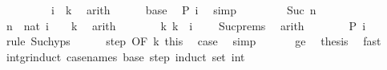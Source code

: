 \begin{isabellebody}
\ {}\isanewline
\ \ \ \ \isamarkupfalse%
\ \isamarkupfalse%
\ {\isachardoublequoteopen}i\ {\isacharequal}{\kern0pt}\ k{\isachardoublequoteclose}\ \isamarkupfalse%
\ arith\isanewline
\ \ \ \ \isamarkupfalse%
\ base\ \isamarkupfalse%
\ {\isachardoublequoteopen}P\ i{\isachardoublequoteclose}\ \isamarkupfalse%
\ simp\isanewline
\ \ \isamarkupfalse%
\isanewline
\ \ \ \ \isamarkupfalse%
\ {\isacharparenleft}{\kern0pt}Suc\ n{\isacharparenright}{\kern0pt}\isanewline
\ \ \ \ \isamarkupfalse%
\ \isamarkupfalse%
\ {\isachardoublequoteopen}n\ {\isacharequal}{\kern0pt}\ nat\ {\isacharparenleft}{\kern0pt}{\isacharparenleft}{\kern0pt}i\ {\isacharminus}{\kern0pt}\ {}{\isacharparenright}{\kern0pt}\ {\isacharminus}{\kern0pt}\ k{\isacharparenright}{\kern0pt}{\isachardoublequoteclose}\ \isamarkupfalse%
\ arith\isanewline
\ \ \ \ \isamarkupfalse%
\ \isamarkupfalse%
\ k{\isacharcolon}{\kern0pt}\ {\isachardoublequoteopen}k\ {\isasymle}\ i\ {\isacharminus}{\kern0pt}\ {}{\isachardoublequoteclose}\ \isamarkupfalse%
\ Suc{\isachardot}{\kern0pt}prems\ \isamarkupfalse%
\ arith\isanewline
\ \ \ \ \isamarkupfalse%
\ \isamarkupfalse%
\ {\isachardoublequoteopen}P\ {\isacharparenleft}{\kern0pt}i\ {\isacharminus}{\kern0pt}\ {}{\isacharparenright}{\kern0pt}{\isachardoublequoteclose}\ \isamarkupfalse%
\ {\isacharparenleft}{\kern0pt}rule\ Suc{\isachardot}{\kern0pt}hyps{\isacharparenright}{\kern0pt}\isanewline
\ \ \ \ \isamarkupfalse%
\ step\ {\isacharbrackleft}{\kern0pt}OF\ k\ this{\isacharbrackright}{\kern0pt}\ \isamarkupfalse%
\ {\isacharquery}{\kern0pt}case\ \isamarkupfalse%
\ simp\isanewline
\ \ \isamarkupfalse%
\isanewline
\ \ \isamarkupfalse%
\ ge\ \isamarkupfalse%
\ {\isacharquery}{\kern0pt}thesis\ \isamarkupfalse%
\ fast\isanewline
{}\isamarkupfalse%
%
\endisatagproof
{\isafoldproof}%
%
\isadelimproof
\isanewline
%
\endisadelimproof
\isanewline
\isanewline
{}\isamarkupfalse%
\ int{\isacharunderscore}{\kern0pt}gr{\isacharunderscore}{\kern0pt}induct\ {\isacharbrackleft}{\kern0pt}case{\isacharunderscore}{\kern0pt}names\ base\ step{\isacharcomma}{\kern0pt}\ induct\ set{\isacharcolon}{\kern0pt}\ int{\isacharbrackright}{\kern0pt}{\isacharcolon}{\kern0pt}\isanewline

\end{isabellebody}
